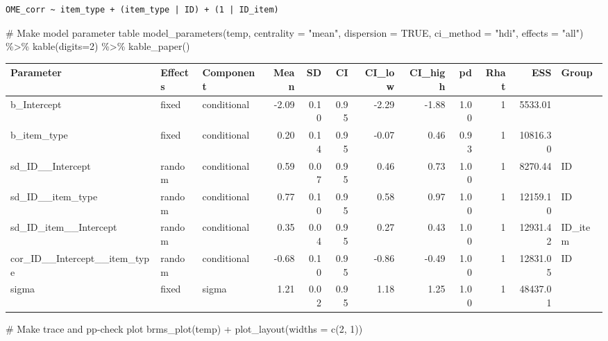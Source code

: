 \documentclass[
  letterpaper,
  DIV=11,
  numbers=noendperiod]{scrartcl}
\newenvironment{Shaded}{\begin{snugshade}}{\end{snugshade}}
\newcommand{\AttributeTok}[1]{\textcolor[rgb]{0.40,0.45,0.13}{#1}}
\newcommand{\CommentTok}[1]{\textcolor[rgb]{0.37,0.37,0.37}{#1}}
\newcommand{\ConstantTok}[1]{\textcolor[rgb]{0.56,0.35,0.01}{#1}}
\newcommand{\DecValTok}[1]{\textcolor[rgb]{0.68,0.00,0.00}{#1}}
\newcommand{\FunctionTok}[1]{\textcolor[rgb]{0.28,0.35,0.67}{#1}}
\newcommand{\NormalTok}[1]{\textcolor[rgb]{0.00,0.23,0.31}{#1}}
\newcommand{\SpecialCharTok}[1]{\textcolor[rgb]{0.37,0.37,0.37}{#1}}
\newcommand{\StringTok}[1]{\textcolor[rgb]{0.13,0.47,0.30}{#1}}
\begin{document}
\begin{verbatim}
OME_corr ~ item_type + (item_type | ID) + (1 | ID_item) 
\end{verbatim}

\begin{Shaded}
\begin{Highlighting}[]
\CommentTok{\# Make model parameter table}
\FunctionTok{model\_parameters}\NormalTok{(temp, }\AttributeTok{centrality =} \StringTok{"mean"}\NormalTok{, }\AttributeTok{dispersion =} \ConstantTok{TRUE}\NormalTok{, }
                 \AttributeTok{ci\_method =} \StringTok{"hdi"}\NormalTok{, }\AttributeTok{effects =} \StringTok{"all"}\NormalTok{) }\SpecialCharTok{\%\textgreater{}\%} 
  \FunctionTok{kable}\NormalTok{(}\AttributeTok{digits=}\DecValTok{2}\NormalTok{) }\SpecialCharTok{\%\textgreater{}\%} \FunctionTok{kable\_paper}\NormalTok{()}
\end{Highlighting}
\end{Shaded}

\begin{longtable*}[t]{lllrrrrrrrrl}
\toprule
Parameter & Effects & Component & Mean & SD & CI & CI\_low & CI\_high & pd & Rhat & ESS & Group\\
\midrule
b\_Intercept & fixed & conditional & -2.09 & 0.10 & 0.95 & -2.29 & -1.88 & 1.00 & 1 & 5533.01 & \\
b\_item\_type & fixed & conditional & 0.20 & 0.14 & 0.95 & -0.07 & 0.46 & 0.93 & 1 & 10816.30 & \\
sd\_ID\_\_Intercept & random & conditional & 0.59 & 0.07 & 0.95 & 0.46 & 0.73 & 1.00 & 1 & 8270.44 & ID\\
sd\_ID\_\_item\_type & random & conditional & 0.77 & 0.10 & 0.95 & 0.58 & 0.97 & 1.00 & 1 & 12159.10 & ID\\
sd\_ID\_item\_\_Intercept & random & conditional & 0.35 & 0.04 & 0.95 & 0.27 & 0.43 & 1.00 & 1 & 12931.42 & ID\_item\\
\addlinespace
cor\_ID\_\_Intercept\_\_item\_type & random & conditional & -0.68 & 0.10 & 0.95 & -0.86 & -0.49 & 1.00 & 1 & 12831.05 & ID\\
sigma & fixed & sigma & 1.21 & 0.02 & 0.95 & 1.18 & 1.25 & 1.00 & 1 & 48437.01 & \\
\bottomrule
\end{longtable*}

\begin{Shaded}
\begin{Highlighting}[]
\CommentTok{\# Make trace and pp{-}check plot}
\FunctionTok{brms\_plot}\NormalTok{(temp)  }\SpecialCharTok{+} \FunctionTok{plot\_layout}\NormalTok{(}\AttributeTok{widths =} \FunctionTok{c}\NormalTok{(}\DecValTok{2}\NormalTok{, }\DecValTok{1}\NormalTok{))}
\end{Highlighting}
\end{Shaded}
\end{document}
